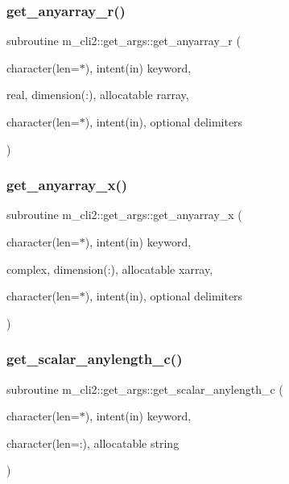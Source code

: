 \subsubsection{\texorpdfstring{get\+\_\+anyarray\+\_\+r()}{get\_anyarray\_r()}}
{\footnotesize\ttfamily subroutine m\+\_\+cli2\+::get\+\_\+args\+::get\+\_\+anyarray\+\_\+r (\begin{DoxyParamCaption}\item[{character(len=$\ast$), intent(in)}]{keyword,  }\item[{real, dimension(\+:), allocatable}]{rarray,  }\item[{character(len=$\ast$), intent(in), optional}]{delimiters }\end{DoxyParamCaption})\hspace{0.3cm}{\ttfamily [private]}}

\mbox{\label{interfacem__cli2_1_1get__args_a8581641c551aa6fe4c0592fb63de11fe}} 
\subsubsection{\texorpdfstring{get\+\_\+anyarray\+\_\+x()}{get\_anyarray\_x()}}
{\footnotesize\ttfamily subroutine m\+\_\+cli2\+::get\+\_\+args\+::get\+\_\+anyarray\+\_\+x (\begin{DoxyParamCaption}\item[{character(len=$\ast$), intent(in)}]{keyword,  }\item[{complex, dimension(\+:), allocatable}]{xarray,  }\item[{character(len=$\ast$), intent(in), optional}]{delimiters }\end{DoxyParamCaption})\hspace{0.3cm}{\ttfamily [private]}}

\mbox{\label{interfacem__cli2_1_1get__args_a42c3b7050881edf76682b7b0058b868a}} 
\subsubsection{\texorpdfstring{get\+\_\+scalar\+\_\+anylength\+\_\+c()}{get\_scalar\_anylength\_c()}}
{\footnotesize\ttfamily subroutine m\+\_\+cli2\+::get\+\_\+args\+::get\+\_\+scalar\+\_\+anylength\+\_\+c (\begin{DoxyParamCaption}\item[{character(len=$\ast$), intent(in)}]{keyword,  }\item[{character(len=\+:), allocatable}]{string }\end{DoxyParamCaption})\hspace{0.3cm}{\ttfamily [private]}}

